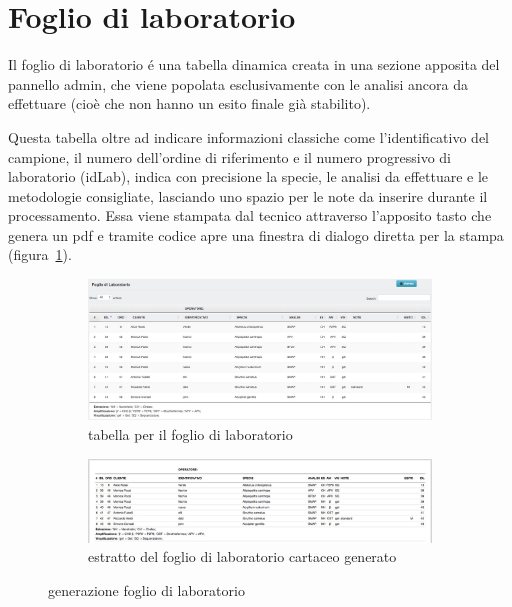 \section*{Foglio di laboratorio}
Il \textsf{foglio di laboratorio} é una tabella dinamica creata in una sezione apposita del pannello admin, che viene popolata esclusivamente con le analisi ancora da effettuare (cioè che non hanno un esito finale già stabilito).

Questa tabella oltre ad indicare informazioni classiche come l'identificativo del campione, il numero dell'ordine di riferimento e il numero progressivo di laboratorio (idLab), indica con precisione la specie, le analisi da effettuare e le metodologie consigliate, lasciando uno spazio per le note da inserire durante il processamento. Essa viene stampata dal tecnico attraverso l'apposito tasto che genera un pdf e tramite codice {\js} apre una finestra di dialogo diretta per la stampa (figura~\ref{fig:admin-fogliolab}).

\begin{figure}
 \centering
 \begin{subfigure}[b]{0.95\textwidth}
   \includegraphics[width=\textwidth]{images/admin-fogliolab-tab} 
   \caption{tabella per il foglio di laboratorio}
 \end{subfigure}
 \begin{subfigure}[b]{0.95\textwidth}
   \includegraphics[width=\textwidth]{images/admin-fogliolab}
   \caption{estratto del foglio di laboratorio cartaceo generato}
 \end{subfigure}
 \caption{generazione foglio di laboratorio}
 \label{fig:admin-fogliolab}
\end{figure}


